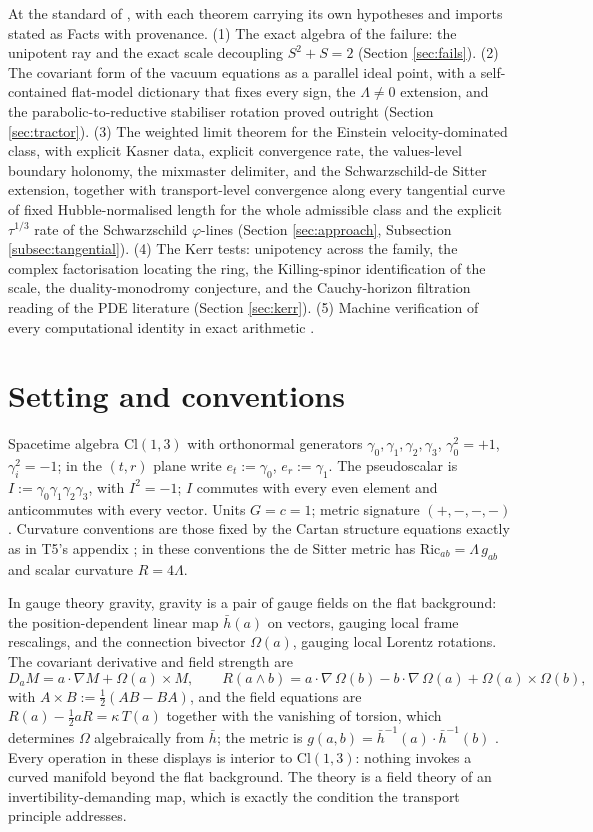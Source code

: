 \documentclass[11pt]{article}
\theoremstyle{definition}
\newcommand{\Cl}{\mathrm{Cl}}
\newcommand{\hb}{\bar{h}}
\newcommand{\er}{e_r}
\newcommand{\et}{e_t}
\newcommand{\Ric}{\mathrm{Ric}}
\begin{document}
At the standard of \cite{ButlerT1}, with each theorem carrying its own hypotheses and imports stated as Facts with provenance. (1) The exact algebra of the failure: the unipotent ray and the exact scale decoupling $S^2 + S = 2$ (Section \ref{sec:fails}). (2) The covariant form of the vacuum equations as a parallel ideal point, with a self-contained flat-model dictionary that fixes every sign, the $\Lambda \neq 0$ extension, and the parabolic-to-reductive stabiliser rotation proved outright (Section \ref{sec:tractor}). (3) The weighted limit theorem for the Einstein velocity-dominated class, with explicit Kasner data, explicit convergence rate, the values-level boundary holonomy, the mixmaster delimiter, and the Schwarzschild-de Sitter extension, together with transport-level convergence along every tangential curve of fixed Hubble-normalised length for the whole admissible class and the explicit $\tau^{1/3}$ rate of the Schwarzschild $\varphi$-lines (Section \ref{sec:approach}, Subsection \ref{subsec:tangential}). (4) The Kerr tests: unipotency across the family, the complex factorisation locating the ring, the Killing-spinor identification of the scale, the duality-monodromy conjecture, and the Cauchy-horizon filtration reading of the PDE literature (Section \ref{sec:kerr}). (5) Machine verification of every computational identity in exact arithmetic \cite{ButlerVerifyT06}.

\section{Setting and conventions}\label{sec:setting}

Spacetime algebra $\Cl(1,3)$ with orthonormal generators $\gamma_0, \gamma_1, \gamma_2, \gamma_3$, $\gamma_0^2 = +1$, $\gamma_i^2 = -1$; in the $(t,r)$ plane write $\et := \gamma_0$, $\er := \gamma_1$. The pseudoscalar is $I := \gamma_0\gamma_1\gamma_2\gamma_3$, with $I^2 = -1$; $I$ commutes with every even element and anticommutes with every vector. Units $G = c = 1$; metric signature $(+,-,-,-)$. Curvature conventions are those fixed by the Cartan structure equations exactly as in T5's appendix \cite[App.~A]{ButlerT5}; in these conventions the de Sitter metric has $\Ric_{ab} = \Lambda\, g_{ab}$ and scalar curvature $R = 4\Lambda$.

In gauge theory gravity, gravity is a pair of gauge fields on the flat background: the position-dependent linear map $\hb(a)$ on vectors, gauging local frame rescalings, and the connection bivector $\Omega(a)$, gauging local Lorentz rotations. The covariant derivative and field strength are
\[
D_a M = a \cdot \nabla M + \Omega(a) \times M, \qquad
R(a \wedge b) = a\cdot\nabla\,\Omega(b) - b\cdot\nabla\,\Omega(a) + \Omega(a) \times \Omega(b),
\]
with $A \times B := \tfrac12(AB - BA)$, and the field equations are $R(a) - \tfrac12 a R = \kappa\, T(a)$ together with the vanishing of torsion, which determines $\Omega$ algebraically from $\hb$; the metric is $g(a,b) = \hb^{-1}(a) \cdot \hb^{-1}(b)$ \cite{LDG1998}. Every operation in these displays is interior to $\Cl(1,3)$: nothing invokes a curved manifold beyond the flat background. The theory is a field theory of an invertibility-demanding map, which is exactly the condition the transport principle addresses.
\end{document}
